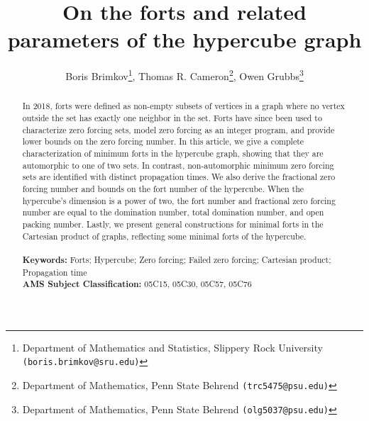 \documentclass[twoside, 12pt]{article}
\theoremstyle{definition}
\begin{document}
\title{\bf On the forts and related parameters of the hypercube graph}
\author{Boris Brimkov\footnote{Department of Mathematics and Statistics, Slippery Rock University {\tt (boris.brimkov@sru.edu)}}, Thomas R. Cameron\footnote{Department of Mathematics, Penn State Behrend {\tt (trc5475@psu.edu)}}, Owen Grubbs\footnote{Department of Mathematics, Penn State Behrend {\tt (olg5037@psu.edu)}}}
\maketitle

\begin{abstract}
In 2018, forts were defined as non-empty subsets of vertices in a graph where no  vertex outside the set has exactly one neighbor in the set. Forts have since been used to characterize zero forcing sets, model zero forcing as an integer program, and provide lower bounds on the zero forcing number. In this article, we give a complete characterization of minimum forts in the hypercube graph, showing that they are automorphic to one of two sets. In contrast, non-automorphic minimum zero forcing sets are identified with distinct propagation times. We also derive the fractional zero forcing number and bounds on the fort number of the hypercube. When the hypercube's dimension is a power of two, the fort number and fractional zero forcing number are equal to the domination number, total domination number, and open packing number. Lastly, we present general constructions for minimal forts in the Cartesian product of graphs, reflecting some minimal forts of the hypercube.
\\ \\
\textbf{Keywords:} Forts; Hypercube; Zero forcing; Failed zero forcing; Cartesian product; Propagation time
\\
\textbf{AMS Subject Classification:} 05C15, 05C30, 05C57, 05C76
\end{abstract}
\thispagestyle{empty}
\end{document}

